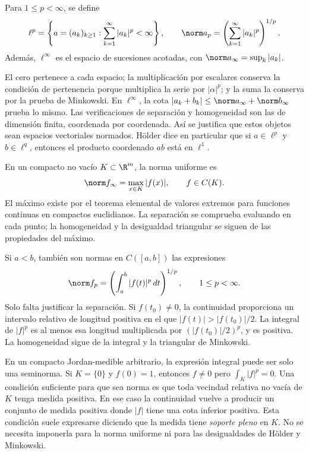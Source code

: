 \begin{definicion}
Para $1\le p<\infty$, se define
\[
\ell^p=\left\{a=(a_k)_{k\ge1}:\sum_{k=1}^{\infty}|a_k|^p<\infty\right\},
\qquad \norm a_p=\left(\sum_{k=1}^{\infty}|a_k|^p\right)^{1/p}.
\]
Además, $\ell^\infty$ es el espacio de sucesiones acotadas, con $\norm a_\infty=\sup_k|a_k|$.
\end{definicion}
El cero pertenece a cada espacio; la multiplicación por escalares conserva la condición de pertenencia porque multiplica la serie por $|\alpha|^p$; y la suma la conserva por la prueba de Minkowski. En $\ell^\infty$, la cota $|a_k+b_k|\le\norm a_\infty+\norm b_\infty$ prueba lo mismo. Las verificaciones de separación y homogeneidad son las de dimensión finita, coordenada por coordenada. Así se justifica que estos objetos sean espacios vectoriales normados. Hölder dice en particular que si $a\in\ell^p$ y $b\in\ell^q$, entonces el producto coordenado $ab$ está en $\ell^1$.

\begin{ejemplo}\label{ch01:funciones}
En un compacto no vacío $K\subset\R^m$, la norma uniforme es
\[
\norm f_\infty=\max_{x\in K}|f(x)|,\qquad f\in C(K).
\]
El máximo existe por el teorema elemental de valores extremos para funciones continuas en compactos euclidianos. La separación se comprueba evaluando en cada punto; la homogeneidad y la desigualdad triangular se siguen de las propiedades del máximo.

Si $a<b$, también son normas en $C([a,b])$ las expresiones
\[
\norm f_p=\left(\int_a^b|f(t)|^p\,dt\right)^{1/p},\qquad 1\le p<\infty.
\]
Solo falta justificar la separación. Si $f(t_0)\ne0$, la continuidad proporciona un intervalo relativo de longitud positiva en el que $|f(t)|>|f(t_0)|/2$. La integral de $|f|^p$ es al menos esa longitud multiplicada por $(|f(t_0)|/2)^p$, y es positiva. La homogeneidad sigue de la integral y la triangular de Minkowski.
\end{ejemplo}
\begin{observacion}
En un compacto Jordan-medible arbitrario, la expresión integral puede ser solo una seminorma. Si $K=\{0\}$ y $f(0)=1$, entonces $f\ne0$ pero $\int_K|f|^p=0$. Una condición suficiente para que sea norma es que toda vecindad relativa no vacía de $K$ tenga medida positiva. En ese caso la continuidad vuelve a producir un conjunto de medida positiva donde $|f|$ tiene una cota inferior positiva. Esta condición suele expresarse diciendo que la medida tiene \emph{soporte pleno} en $K$. No se necesita imponerla para la norma uniforme ni para las desigualdades de Hölder y Minkowski.
\end{observacion}


